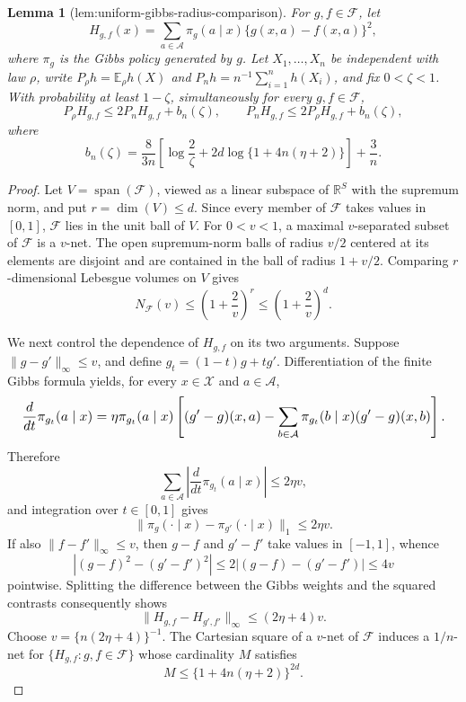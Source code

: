 \documentclass{article}
\newtheorem{lemma}{Lemma}
\begin{document}
\begin{lemma}[lem:uniform-gibbs-radius-comparison]\label{lem:uniform-gibbs-radius-comparison}
For \(g,f\in\mathcal F\), let
\[
H_{g,f}(x)=\sum_{a\in\mathcal A}\pi_g(a\mid x)\{g(x,a)-f(x,a)\}^2,
\]
where \(\pi_g\) is the Gibbs policy generated by \(g\). Let \(X_1,\ldots,X_n\) be independent with law \(\rho\), write \(P_\rho h=\mathbb E_\rho h(X)\) and \(P_nh=n^{-1}\sum_{i=1}^nh(X_i)\), and fix \(0<\zeta<1\). With probability at least \(1-\zeta\), simultaneously for every \(g,f\in\mathcal F\),
\[
P_\rho H_{g,f}\le2P_nH_{g,f}+b_n(\zeta),
\qquad
P_nH_{g,f}\le2P_\rho H_{g,f}+b_n(\zeta),
\]
where
\[
b_n(\zeta)=\frac{8}{3n}\left[\log\frac2\zeta+2d\log\{1+4n(\eta+2)\}\right]+\frac3n.
\]
\end{lemma}
\begin{proof}
Let \(V=\operatorname{span}(\mathcal F)\), viewed as a linear subspace of \(\mathbb R^S\) with the supremum norm, and put \(r=\dim(V)\le d\). Since every member of \(\mathcal F\) takes values in \([0,1]\), \(\mathcal F\) lies in the unit ball of \(V\). For \(0<v<1\), a maximal \(v\)-separated subset of \(\mathcal F\) is a \(v\)-net. The open supremum-norm balls of radius \(v/2\) centered at its elements are disjoint and are contained in the ball of radius \(1+v/2\). Comparing \(r\)-dimensional Lebesgue volumes on \(V\) gives
\[
N_{\mathcal F}(v)\le \left(1+\frac{2}{v}\right)^r\le \left(1+\frac{2}{v}\right)^d.
\]

We next control the dependence of \(H_{g,f}\) on its two arguments. Suppose \(\lVert g-g'\rVert_\infty\le v\), and define \(g_t=(1-t)g+tg'\). Differentiation of the finite Gibbs formula yields, for every \(x\in\mathcal X\) and \(a\in\mathcal A\),
\[
\makebox[\linewidth][c]{\resizebox{0.98\linewidth}{!}{\(\displaystyle \frac{d}{dt}\pi_{g_t}(a\mid x)
=\eta\pi_{g_t}(a\mid x)\left[(g'-g)(x,a)-\sum_{b\in\mathcal A}\pi_{g_t}(b\mid x)(g'-g)(x,b)\right].\)}}
\]
Therefore
\[
\sum_{a\in\mathcal A}\left|\frac{d}{dt}\pi_{g_t}(a\mid x)\right|\le 2\eta v,
\]
and integration over \(t\in[0,1]\) gives
\[
\lVert\pi_g(\cdot\mid x)-\pi_{g'}(\cdot\mid x)\rVert_1\le2\eta v.
\]
If also \(\lVert f-f'\rVert_\infty\le v\), then \(g-f\) and \(g'-f'\) take values in \([-1,1]\), whence
\[
\left|(g-f)^2-(g'-f')^2\right|
\le2\left|(g-f)-(g'-f')\right|\le4v
\]
pointwise. Splitting the difference between the Gibbs weights and the squared contrasts consequently shows
\[
\lVert H_{g,f}-H_{g',f'}\rVert_\infty\le(2\eta+4)v.
\]
Choose \(v=\{n(2\eta+4)\}^{-1}\). The Cartesian square of a \(v\)-net of \(\mathcal F\) induces a \(1/n\)-net for \(\{H_{g,f}:g,f\in\mathcal F\}\) whose cardinality \(M\) satisfies
\[
M\le\{1+4n(\eta+2)\}^{2d}.
\]


\end{proof}
\end{document}
